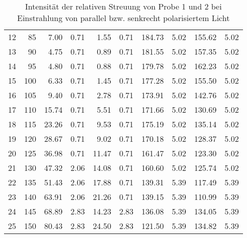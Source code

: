 \begin{table}[h]
\begin{tabular}{lrrrrrrrrr}
    12 &        85 &          7.00 &            0.71 &          1.55 &            0.71 &        184.73 &            5.02 &        155.62 &            5.02 \\
    13 &        90 &          4.75 &            0.71 &          0.89 &            0.71 &        181.55 &            5.02 &        157.35 &            5.02 \\
    14 &        95 &          4.80 &            0.71 &          0.88 &            0.71 &        179.78 &            5.02 &        162.23 &            5.02 \\
    15 &       100 &          6.33 &            0.71 &          1.45 &            0.71 &        177.28 &            5.02 &        155.50 &            5.02 \\
    16 &       105 &          9.40 &            0.71 &          2.78 &            0.71 &        173.91 &            5.02 &        142.76 &            5.02 \\
    17 &       110 &         15.74 &            0.71 &          5.51 &            0.71 &        171.66 &            5.02 &        130.69 &            5.02 \\
    18 &       115 &         23.26 &            0.71 &          9.53 &            0.71 &        175.19 &            5.02 &        135.14 &            5.02 \\
    19 &       120 &         28.67 &            0.71 &          9.02 &            0.71 &        170.18 &            5.02 &        128.37 &            5.02 \\
    20 &       125 &         36.98 &            0.71 &         11.47 &            0.71 &        161.47 &            5.02 &        123.30 &            5.02 \\
    21 &       130 &         47.32 &            2.06 &         14.08 &            0.71 &        160.60 &            5.02 &        125.74 &            5.02 \\
    22 &       135 &         51.43 &            2.06 &         17.88 &            0.71 &        139.31 &            5.39 &        117.49 &            5.39 \\
    23 &       140 &         63.91 &            2.06 &         21.26 &            0.71 &        139.15 &            5.39 &        110.99 &            5.39 \\
    24 &       145 &         68.89 &            2.83 &         14.23 &            2.83 &        136.08 &            5.39 &        134.05 &            5.39 \\
    25 &       150 &         80.43 &            2.83 &         24.50 &            2.83 &        121.50 &            5.39 &        134.82 &            5.39 \\
        \bottomrule
    \end{tabular}
    \caption{Intensität der relativen Streuung von Probe 1 und 2 bei Einstrahlung von parallel bzw. senkrecht polarisiertem Licht}
\end{table}
\newpage

